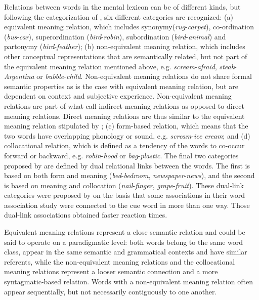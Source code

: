 \documentclass[output=paper,colorlinks,citecolor=brown,nonflat]{langsci/langscibook}
\begin{document}
Relations between words in the mental lexicon can be of different kinds, but following the categorization of \citet{FitzpatrickIzura2011}, six different categories are recognized: (a) equivalent meaning relation, which includes synonymy\linebreak (\textit{rug}{}-\textit{carpet}), co-ordination (\textit{bus}{}-\textit{car}), superordination (\textit{bird}{}-\textit{robin}), subordination (\textit{bird}{}-\textit{animal}) and partonymy (\textit{bird}{}-\textit{feather}); (b) non-equivalent meaning relation, which includes other conceptual representations that are semantically related, but not part of the equivalent meaning relation mentioned above, e.g. \textit{scream}{}-\textit{afraid}, \textit{steak}{}-\textit{Argentina} or \textit{bubble}{}-\textit{child}. Non-equivalent meaning relations do not share formal semantic properties as is the case with equivalent meaning relation, but are dependent on context and subjective experience. Non-equivalent meaning relations are part of what \citet[194]{CremerEtAl2010} call indirect meaning relations as opposed to direct meaning relations. Direct meaning relations are thus similar to the equivalent meaning relation stipulated by \citet{FitzpatrickIzura2011}; (c) form-based relation, which means that the two words have overlapping phonology or sound, e.g. \textit{scream}{}-\textit{ice cream}; and (d) collocational relation, which is defined as a tendency of the words to co-occur forward or backward, e.g. \textit{robin}{}-\textit{hood} or \textit{bag}{}-\textit{plastic}. The final two categories proposed by \citet{FitzpatrickIzura2011} are defined by dual relational links between the words. The first is based on both form and meaning (\textit{bed}{}-\textit{bedroom}, \textit{newspaper}{}-\textit{news}), and the second is based on meaning and collocation (\textit{nail}{}-\textit{finger}, \textit{grape}{}-\textit{fruit}). These dual-link categories were proposed by \citet{FitzpatrickIzura2011} on the basis that some associations in their word association study were connected to the cue word in more than one way. Those dual-link associations obtained faster reaction times.

Equivalent meaning relations represent a close semantic relation and could be said to operate on a paradigmatic level: both words belong to the same word class, appear in the same semantic and grammatical contexts and have similar referents, while the non-equivalent meaning relations and the collocational meaning relations represent a looser semantic connection and a more syntagmatic-based relation. Words with a non-equivalent meaning relation often appear sequentially, but not necessarily contiguously to one another.
\end{document}
